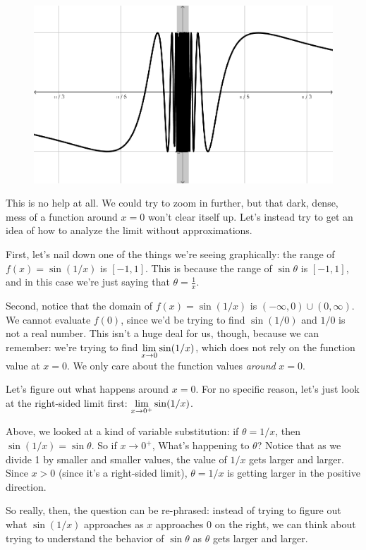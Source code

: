 \begin{figure}[h!tb]
  \includegraphics[scale=1]{./1_limits/images/1-1_graph5.png}
  \centering
\end{figure}

This is no help at all. We could try to zoom in further, but that dark, dense, mess of a function around $x=0$ won't clear itself up.
Let's instead try to get an idea of how to analyze the limit without approximations.

First, let's nail down one of the things we're seeing graphically: the range of $f(x) = \sin(1/x)$ is $[-1,1]$.
This is because the range of $\sin\theta$ is $[-1,1]$, and in this case we're just saying that $\theta = \frac{1}{x}$.

Second, notice that the domain of $f(x) = \sin(1/x)$ is $(-\infty,0)\cup(0,\infty)$. We cannot evaluate $f(0)$, since we'd be trying to find $\sin(1/0)$ and $1/0$ is not a real number.
This isn't a huge deal for us, though, because we can remember: we're trying to find $\displaystyle \lim_{x\to0} \sin(1/x)$, which does not rely on the function value at $x=0$.
We only care about the function values \textit{around} $x=0$.

Let's figure out what happens around $x=0$.
For no specific reason, let's just look at the right-sided limit first: $\displaystyle \lim_{x\to 0^+} \sin(1/x)$.

Above, we looked at a kind of variable substitution: if $\theta = 1/x$, then $\sin(1/x) = \sin \theta$.
So if $x\to 0^+$, What's happening to $\theta$?
Notice that as we divide 1 by smaller and smaller values, the value of $1/x$ gets larger and larger.
Since $x>0$ (since it's a right-sided limit), $\theta = 1/x$ is getting larger in the positive direction.

So really, then, the question can be re-phrased: instead of trying to figure out what $\sin(1/x)$ approaches as $x$ approaches $0$ on the right, we can think about trying to understand the behavior of $\sin \theta$ as $\theta$ gets larger and larger.

